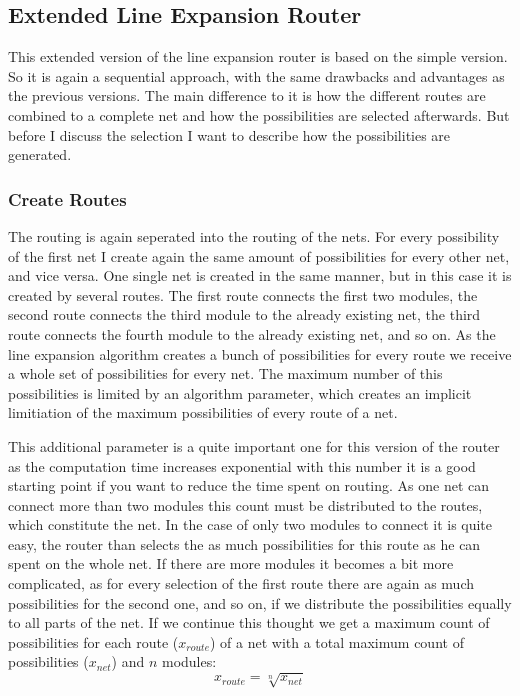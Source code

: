 \subsection{Extended Line Expansion Router}
This extended version of the line expansion router is based on the simple version. So it is again a sequential approach, with the same drawbacks and advantages as the previous versions. The main difference to it is how the different routes are combined to a complete net and how the possibilities are selected afterwards. But before I discuss the selection I want to describe how the possibilities are generated.

\subsubsection{Create Routes}
The routing is again seperated into the routing of the nets. For every possibility of the first net I create again the same amount of possibilities for every other net, and vice versa. One single net is created in the same manner, but in this case it is created by several routes. The first route connects the first two modules, the second route connects the third module to the already existing net, the third route connects the fourth module to the already existing net, and so on. As the line expansion algorithm creates a bunch of possibilities for every route we receive a whole set of possibilities for every net. The maximum number of this possibilities is limited by an algorithm parameter, which creates an implicit limitiation of the maximum possibilities of every route of a net.

This additional parameter is a quite important one for this version of the router as the computation time increases exponential with this number it is a good starting point if you want to reduce the time spent on routing. As one net can connect more than two modules this count must be distributed to the routes, which constitute the net. In the case of only two modules to connect it is quite easy, the router than selects the as much possibilities for this route as he can spent on the whole net. If there are more modules it becomes a bit more complicated, as for every selection of the first route there are again as much possibilities for the second one, and so on, if we distribute the possibilities equally to all parts of the net. If we continue this thought we get a maximum count of possibilities for each route ($x_{route}$) of a net with a total maximum count of possibilities ($x_{net}$) and $n$ modules:
\[x_{route} = \sqrt[n]{x_{net}}\]

